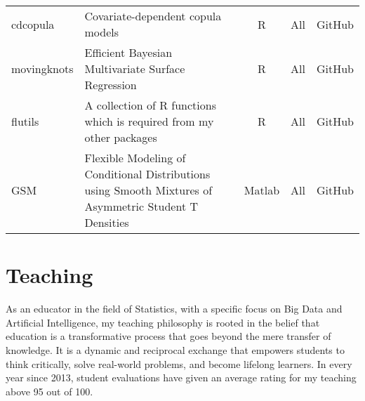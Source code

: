 \documentclass[twoside,a4paper]{article}
\begin{document}
\begin{center}
\begin{tabular}{lp{9cm}ccl}
cdcopula    & Covariate-dependent copula models                                                                                    & R        & All         & GitHub       \\
movingknots & Efficient Bayesian Multivariate Surface Regression                                                                   & R        & All         & GitHub       \\
flutils     & A collection of R functions which is required from my other packages                                                 & R        & All         & GitHub       \\
GSM         & Flexible Modeling of Conditional Distributions using Smooth Mixtures of Asymmetric Student T Densities               & Matlab   & All         & GitHub       \\
  \bottomrule
\end{tabular}
\end{center}

\newpage
\section{Teaching}

\indent As an educator in the field of Statistics, with a specific focus on Big Data and Artificial Intelligence, my teaching philosophy is rooted in the belief that education is a transformative process that goes beyond the mere transfer of knowledge. It is a dynamic and reciprocal exchange that empowers students to think critically, solve real-world problems, and become lifelong learners. In every year since 2013, student evaluations have given an average rating for my teaching above 95 out of 100.
\end{document}
